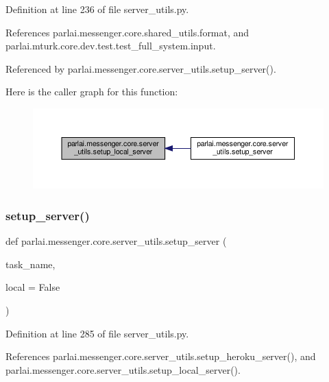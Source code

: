 Definition at line 236 of file server\+\_\+utils.\+py.



References parlai.\+messenger.\+core.\+shared\+\_\+utils.\+format, and parlai.\+mturk.\+core.\+dev.\+test.\+test\+\_\+full\+\_\+system.\+input.



Referenced by parlai.\+messenger.\+core.\+server\+\_\+utils.\+setup\+\_\+server().

Here is the caller graph for this function\+:
\nopagebreak
\begin{figure}[H]
\begin{center}
\leavevmode
\includegraphics[width=350pt]{namespaceparlai_1_1messenger_1_1core_1_1server__utils_a3b993fcdfa397479c469c7d20dcbfd9d_icgraph}
\end{center}
\end{figure}
\mbox{\label{namespaceparlai_1_1messenger_1_1core_1_1server__utils_a006ba5635b31336c4dd80b795025b29b}} 
\subsubsection{\texorpdfstring{setup\+\_\+server()}{setup\_server()}}
{\footnotesize\ttfamily def parlai.\+messenger.\+core.\+server\+\_\+utils.\+setup\+\_\+server (\begin{DoxyParamCaption}\item[{}]{task\+\_\+name,  }\item[{}]{local = {\ttfamily False} }\end{DoxyParamCaption})}



Definition at line 285 of file server\+\_\+utils.\+py.



References parlai.\+messenger.\+core.\+server\+\_\+utils.\+setup\+\_\+heroku\+\_\+server(), and parlai.\+messenger.\+core.\+server\+\_\+utils.\+setup\+\_\+local\+\_\+server().

